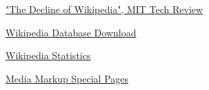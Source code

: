 \documentclass[twoside]{article}
\begin{document}
\newpage

\begin{thebibliography}{10}
\href{ http://www.technologyreview.com/featuredstory/520446/the-decline-of-wikipedia/}{"The Decline of Wikipedia", MIT Tech Review}

\href{https://en.wikipedia.org/wiki/Wikipedia:Database_download}{Wikipedia Database Download}

\href{https://en.wikipedia.org/wiki/Wikipedia:Statistics}{Wikipedia Statistics}

\href{http://en.wikipedia.org/wiki/Help:Special_page}{Media Markup Special Pages}
\end{thebibliography}
\end{document}
